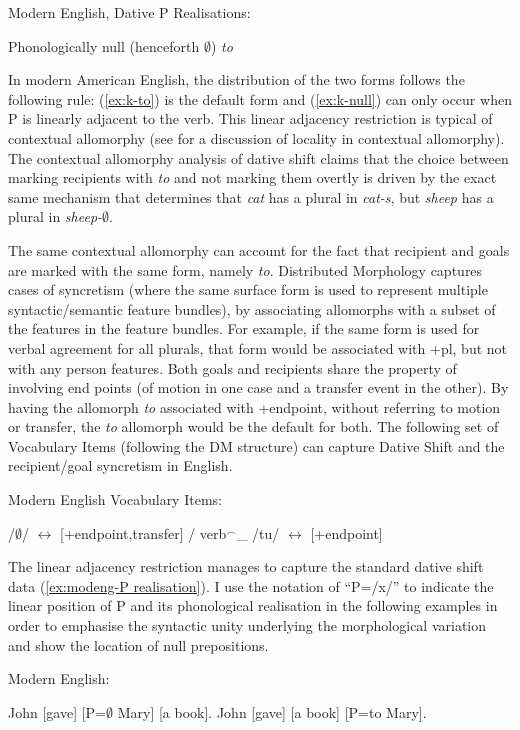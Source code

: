 	\begin{exe}
		\ex Modern English, Dative P Realisations:
		\begin{xlist}
			\ex Phonologically null\label{ex:k-null} (henceforth $\emptyset$)
			\ex \textit{to}\label{ex:k-to}
		\end{xlist}
	\end{exe}

	In modern American English, the distribution of the two forms follows the following rule: (\ref{ex:k-to}) is the default form and (\ref{ex:k-null}) can only occur when P is linearly adjacent to the verb. This linear adjacency restriction is typical of contextual allomorphy (see \citet{Embick.2010} for a discussion of locality in contextual allomorphy). The contextual allomorphy analysis of dative shift claims that the choice between marking recipients with \textit{to} and not marking them overtly is driven by the exact same mechanism that determines that \textit{cat} has a plural in \textit{cat-s}, but \textit{sheep} has a plural in \textit{sheep-$\emptyset$}.

	The same contextual allomorphy can account for the fact that recipient and goals are marked with the same form, namely \textit{to}. Distributed Morphology \citep{Halle.1993} captures cases of syncretism (where the same surface form is used to represent multiple syntactic/semantic feature bundles), by associating allomorphs with a subset of the features in the feature bundles. For example, if the same form is used for verbal agreement for all plurals, that form would be associated with +pl, but not with any person features. Both goals and recipients share the property of involving end points (of motion in one case and a transfer event in the other). By having the allomorph \textit{to} associated with +endpoint, without referring to motion or transfer, the \textit{to} allomorph would be the default for both. The following set of Vocabulary Items (following the DM structure) can capture Dative Shift and the recipient/goal syncretism in English.

	\begin{exe}
		\ex Modern English Vocabulary Items:\label{ex:mevi}
		\begin{xlist}
			\ex /$\emptyset$/ $\leftrightarrow$ [+endpoint,transfer] / verb$^{\smallfrown}$\_
			\ex /tu/ $\leftrightarrow$ [+endpoint]
		\end{xlist}
	\end{exe}

	The linear adjacency restriction manages to capture the standard dative shift data (\ref{ex:modeng-P realisation}). I use the notation of ``P=/x/'' to indicate the linear position of P and its phonological realisation in the following examples in order to emphasise the syntactic unity underlying the morphological variation and show the location of null prepositions.
	\begin{exe}
		\ex Modern English:\label{ex:modeng-P realisation}
		\begin{xlist}
	\ex John [gave] [P=$\emptyset$ Mary] [a book].
	\ex John [gave] [a book] [P=to Mary].
\end{xlist}
	\end{exe}

